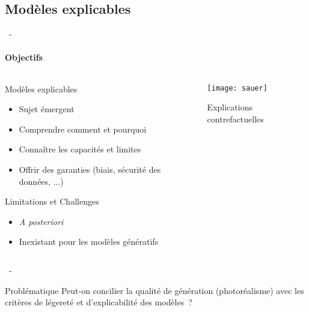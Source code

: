\documentclass[aspectratio=169, 22pt]{beamer}
\begin{document}
\subsection{Modèles explicables}
\begin{frame}{\secname~- \subsecname}
  \framesubtitle{Objectifs}
  \begin{columns}
    \begin{column}{0.5\linewidth}
      \begin{block}{Modèles explicables}        
        \begin{itemize}
        \item \small Sujet émergent
        \item \small Comprendre comment et pourquoi 
        \item \small Connaître les capacités et limites
        \item \small Offrir des garanties (biais, sécurité des données, ...)
        \end{itemize}
      \end{block}
      \begin{alertblock}{Limitations et Challenges}
        \begin{itemize}
        \item \small \emph{A posteriori}
        \item \small Inexistant pour les modèles génératifs
        \end{itemize}
      \end{alertblock}
    \end{column}
    \begin{column}{0.5\linewidth}
      \begin{figure}
        \centering
        \texttt{[image: sauer]}
        \caption{{Explications contrefactuelles \newline [Sauer et al., 2021]}}
      \end{figure}
    \end{column}
  \end{columns}    
\end{frame}

\begin{frame}{\secname~- \subsecname}
  \begin{customblock}{\centering Problématique}
    \centering
    Peut-on concilier la qualité de génération (photoréalisme) avec
    les critères de légereté et d'explicabilité des modèles ?
  \end{customblock}
\end{frame}
\end{document}
